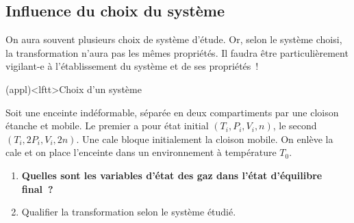 \documentclass[../../main/main.tex]{subfiles}
\begin{document}
\subsection{Influence du choix du système}
On aura souvent plusieurs choix de système d'étude. Or, selon le système choisi,
la transformation n'aura pas les mêmes propriétés. Il faudra être
particulièrement vigilant-e à l'établissement du système et de ses propriétés~!

\begin{tcb*}[breakable](appl)<lftt>{Choix d'un système}
	\begin{isd}
		Soit une enceinte indéformable, séparée en deux compartiments par une cloison
		étanche et mobile. Le premier a pour état initial $(T_i,P_i,V_i,n)$, le second
		$(T_i,2P_i,V_i,2n)$. Une cale bloque initialement la cloison mobile. On enlève
		la cale et on place l'enceinte dans un environnement à température $T_0$.
		\tcblower
		\begin{center}
			\vspace{-15pt}
		\end{center}
	\end{isd}
	\begin{enumerate}
		\item \textbf{Quelles sont les variables d'état des gaz dans l'état
			      d'équilibre final~?}
		\item Qualifier la transformation selon le système étudié.
	\end{enumerate}

\end{tcb*}
\end{document}
